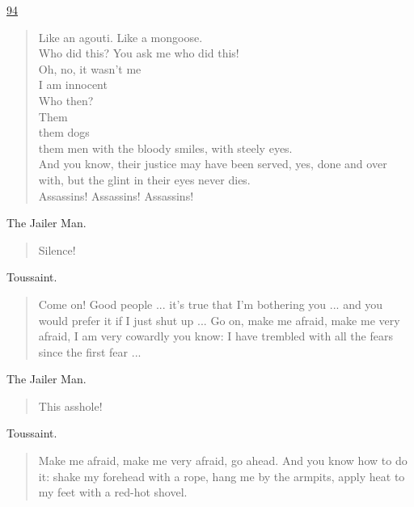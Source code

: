 \documentclass[letterpaper,article,12pt,oneside,notitlepage]{memoir}
\begin{document}
\href{http://cesaire.elotroalex.com/chiens/chiens/p094.html}{94}

\begin{verse}
Like an agouti. Like a mongoose. \\
Who did this? You ask me who did this! \\
Oh, no, it wasn't me \\
I am innocent \\
Who then? \\
Them \\
them dogs \\
them men with the bloody smiles, with steely eyes. \\
And you know, their justice may have been served, yes, done and over with, but the glint in their eyes never dies. \\
Assassins! Assassins! Assassins! \\
\end{verse}

\begin{center}The Jailer Man.\end{center}

\begin{verse}
Silence! \\
\end{verse}

\begin{center}Toussaint.\end{center}

\begin{verse}
Come on! Good people ... it's true that I'm bothering you ... and you would prefer it if I just shut up ... Go on, make me afraid, make me very afraid, I am very cowardly you know: I have trembled with all the fears since the first fear ...  \\
\end{verse}

\begin{center}The Jailer Man.\end{center}

\begin{verse}
This asshole! \\
\end{verse}

\begin{center}Toussaint.\end{center}

\begin{verse}
Make me afraid, make me very afraid, go ahead. And you know how to do it: shake my forehead with a rope, hang me by the armpits, apply heat to my feet with a red-hot shovel. \\
\end{verse}
\end{document}
